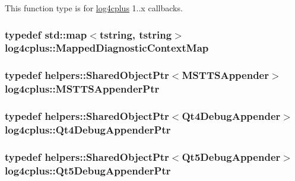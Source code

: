 This function type is for \hyperlink{namespacelog4cplus}{log4cplus} 1..\-x callbacks. 

\hypertarget{namespacelog4cplus_a8b5b860e781a3d8d5c3d7d743a630b8a}{
\subsubsection[{Mapped\-Diagnostic\-Context\-Map}]{\setlength{\rightskip}{0pt plus 5cm}typedef std\-::map$<${\bf tstring}, {\bf tstring}$>$ {\bf log4cplus\-::\-Mapped\-Diagnostic\-Context\-Map}}}\label{namespacelog4cplus_a8b5b860e781a3d8d5c3d7d743a630b8a}
\hypertarget{namespacelog4cplus_a87109c16bf25081e70e4ad3d4c799964}{
\subsubsection[{M\-S\-T\-T\-S\-Appender\-Ptr}]{\setlength{\rightskip}{0pt plus 5cm}typedef {\bf helpers\-::\-Shared\-Object\-Ptr}$<${\bf M\-S\-T\-T\-S\-Appender}$>$ {\bf log4cplus\-::\-M\-S\-T\-T\-S\-Appender\-Ptr}}}\label{namespacelog4cplus_a87109c16bf25081e70e4ad3d4c799964}
\hypertarget{namespacelog4cplus_af461423bca3efc0b77db918c413acace}{
\subsubsection[{Qt4\-Debug\-Appender\-Ptr}]{\setlength{\rightskip}{0pt plus 5cm}typedef {\bf helpers\-::\-Shared\-Object\-Ptr}$<${\bf Qt4\-Debug\-Appender}$>$ {\bf log4cplus\-::\-Qt4\-Debug\-Appender\-Ptr}}}\label{namespacelog4cplus_af461423bca3efc0b77db918c413acace}
\hypertarget{namespacelog4cplus_afceeef4e59b8ef61f097251fe6cd3f52}{
\subsubsection[{Qt5\-Debug\-Appender\-Ptr}]{\setlength{\rightskip}{0pt plus 5cm}typedef {\bf helpers\-::\-Shared\-Object\-Ptr}$<${\bf Qt5\-Debug\-Appender}$>$ {\bf log4cplus\-::\-Qt5\-Debug\-Appender\-Ptr}}}\label{namespacelog4cplus_afceeef4e59b8ef61f097251fe6cd3f52}
